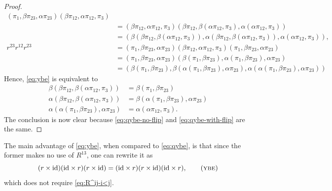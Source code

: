 \begin{proof}
\begin{align*}
                (\pi_1,\beta\pi_{23},\alpha\pi_{23})
                (\beta\pi_{12},\alpha\pi_{12},\pi_3)\\
            &= (\beta\pi_{12},\alpha\pi_{12},\pi_3)
                (\beta\pi_{12},\beta(\alpha\pi_{12},\pi_3)
                ,\alpha(\alpha\pi_{12},\pi_3))\\
            &= (\beta(\beta\pi_{12}
                ,\beta(\alpha\pi_{12},\pi_3))
                ,\alpha(\beta\pi_{12},\beta(\alpha\pi_{12},\pi_3))
                ,\alpha(\alpha\pi_{12},\pi_3)),\\
        r^{23}r^{12}r^{23} &= (\pi_1,\beta\pi_{23},\alpha\pi_{23})
                (\beta\pi_{12},\alpha\pi_{12},\pi_3)
                (\pi_1,\beta\pi_{23},\alpha\pi_{23})\\
            &= (\pi_1,\beta\pi_{23},\alpha\pi_{23})
                (\beta(\pi_1,\beta\pi_{23})
                ,\alpha(\pi_1,\beta\pi_{23})
                ,\alpha\pi_{23})\\
            &= (\beta(\pi_1,\beta\pi_{23})
                ,\beta(\alpha(\pi_1,\beta\pi_{23}),\alpha\pi_{23})
                ,\alpha(\alpha(\pi_1,\beta\pi_{23}),\alpha\pi_{23}))
    \end{align*}
    Hence, \eqref{eq:ybe} is equivalent to
    \begin{align}\label{eq:qybe-with-flip}
        \beta(\beta\pi_{12},\beta(\alpha\pi_{12},\pi_3))
            &= \beta(\pi_1,\beta\pi_{23})\nonumber\\
        \alpha(\beta\pi_{12},\beta(\alpha\pi_{12},\pi_3))
            &= \beta(\alpha(\pi_1,\beta\pi_{23}),\alpha\pi_{23})\\
        \alpha(\alpha(\pi_1,\beta\pi_{23}),\alpha\pi_{23})
            &= \alpha(\alpha\pi_{12},\pi_3).\nonumber
    \end{align}
    The conclusion is now clear because \eqref{eq:qybe-no-flip} and \eqref{eq:qybe-with-flip} are the same.
\end{proof}

\begin{rem}
    The main advantage of \eqref{eq:ybe}, when compared to \eqref{eq:qybe}, is that since the former makes no use of $R^{13}$, one can rewrite it as
    \begin{equation}\label{eq:simpler-ybe}
        (r\times\id)({\id}\times r)(r\times\id)
            = ({\id}\times r)(r\times\id)({\id}\times r),
            \tag{\textsc{ybe}}
    \end{equation}
    which does not require \eqref{eq:R^ij-i<j}.
\end{rem}

